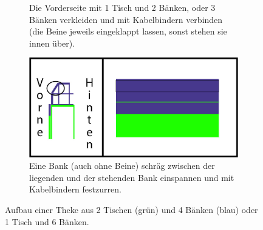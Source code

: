 \begin{figure}[h]
\begin{subfigure}[t]{0.45\textwidth}
    \caption{Die Vorderseite mit 1 Tisch und 2 Bänken, oder 3 Bänken verkleiden und mit Kabelbindern verbinden (die Beine jeweils eingeklappt lassen, sonst stehen sie innen über).}
  \end{subfigure}
  \hfill
  \begin{subfigure}[t]{0.45\textwidth}
    \includegraphics[width=\textwidth]{2d_4.png}
    \caption{Eine Bank (auch ohne Beine) schräg zwischen der liegenden und der stehenden Bank einspannen und mit Kabelbindern festzurren.}
  \end{subfigure}
  \caption{Aufbau einer Theke aus 2 Tischen (grün) und 4 Bänken (blau) oder 1 Tisch und 6 Bänken.}
  \label{theke2d}
\end{figure}

